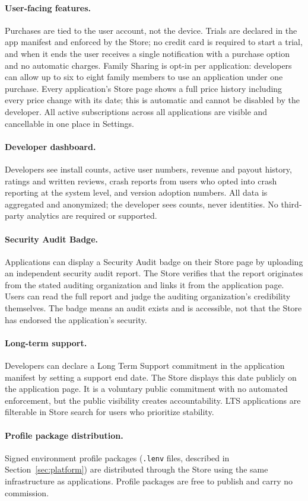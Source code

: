 \paragraph{User-facing features.}
Purchases are tied to the user account, not the device. Trials are declared in
the app manifest and enforced by the Store; no credit card is required to start
a trial, and when it ends the user receives a single notification with a
purchase option and no automatic charges. Family Sharing is opt-in per
application: developers can allow up to six to eight family members to use an
application under one purchase. Every application's Store page shows a full
price history including every price change with its date; this is automatic and
cannot be disabled by the developer. All active subscriptions across all
applications are visible and cancellable in one place in Settings.

\paragraph{Developer dashboard.}
Developers see install counts, active user numbers, revenue and payout history,
ratings and written reviews, crash reports from users who opted into crash
reporting at the system level, and version adoption numbers. All data is
aggregated and anonymized; the developer sees counts, never identities. No
third-party analytics are required or supported.

\paragraph{Security Audit Badge.}
Applications can display a Security Audit badge on their Store page by
uploading an independent security audit report. The Store verifies that the
report originates from the stated auditing organization and links it from the
application page. Users can read the full report and judge the auditing
organization's credibility themselves. The badge means an audit exists and is
accessible, not that the Store has endorsed the application's security.

\paragraph{Long-term support.}
Developers can declare a Long Term Support commitment in the application
manifest by setting a support end date. The Store displays this date publicly
on the application page. It is a voluntary public commitment with no automated
enforcement, but the public visibility creates accountability. LTS applications
are filterable in Store search for users who prioritize stability.

\paragraph{Profile package distribution.}
Signed environment profile packages (\texttt{.lenv} files, described in
Section~\ref{sec:platform}) are distributed through the Store using the same
infrastructure as applications. Profile packages are free to publish and carry
no commission.
